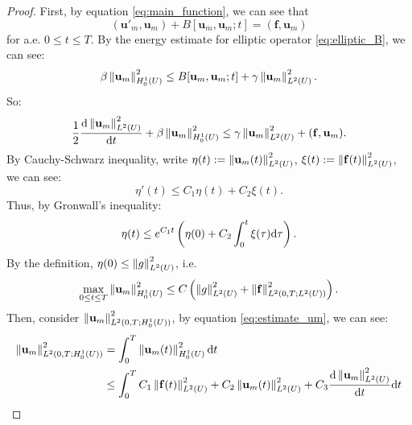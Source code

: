 \begin{proof}
    First, by equation \eqref{eq:main_function}, we can see that 
    \begin{equation}
        \label{eq:variation_for_um}
        (\mathbf{u}'_{m},\mathbf{u}_{m})+B[\mathbf{u}_{m},\mathbf{u}_{m};t]=(\mathbf{f},\mathbf{u}_{m})
    \end{equation}
    for a.e. $0\le t\le T$. By the energy estimate for elliptic operator \eqref{eq:elliptic_B}, we can see:
    \begin{equation}
        \label{eq:parabolic_B}
        \beta\left\|\mathbf{u}_{m}\right\|_{H_{0}^{1}(U)}^{2}\le B[\mathbf{u}_{m},\mathbf{u}_{m};t]+\gamma\left\|\mathbf{u}_{m}\right\|_{L^{2}(U)}^{2}.
    \end{equation}
    So:
    \begin{equation}
        \frac{1}{2}\frac{\mathrm{d} \left\|\mathbf{u}_{m}\right\|_{L^{2}(U)}^{2}}{\mathrm{d} t}+\beta\left\|\mathbf{u}_{m}\right\|_{H_{0}^{1}(U)}^{2}\le\gamma\left\|\mathbf{u}_{m}\right\|_{L^{2}(U)}^{2}+(\mathbf{f},\mathbf{u}_{m}).
    \end{equation}
    By Cauchy-Schwarz inequality, write $\eta(t):=\left\|\mathbf{u}_{m}(t)\right\|_{L^{2}(U)}^{2}$, $\xi(t):=\left\|\mathbf{f}(t)\right\|_{L^{2}(U)}^{2}$, we can see:
    \begin{equation}
        \eta'(t)\le C_{1}\eta(t)+C_{2}\xi(t).
    \end{equation}
    Thus, by Gronwall's inequality:
    \begin{equation}
        \eta(t)\le e^{C_{1}t}\left(\eta(0)+C_{2}\int_{0}^{t}\xi(\tau)\mathrm{d}\tau\right).
    \end{equation}
    By the definition, $\eta(0)\le\left\|g\right\|_{L^{2}(U)}^{2}$, i.e. 
    \begin{equation}
        \label{eq:estimate_um}
        \max_{0\le t\le T}\left\|\mathbf{u}_{m}\right\|_{H_{0}^{1}(U)}^{2}\le C\left(\left\|g\right\|_{L^{2}(U)}^{2}+\left\|\mathbf{f}\right\|_{L^{2}(0,T;L^{2}(U))}^{2}\right).
    \end{equation}
    Then, consider $\left\|\mathbf{u}_{m}\right\|_{L^{2}(0,T;H_{0}^{1}(U))}^{2}$, by equation \eqref{eq:estimate_um}, we can see:
    \begin{equation}
        \begin{aligned}
            \norm{\mathbf{u}_{m}}_{L^{2}(0,T;H_{0}^{1}(U))}^{2}&=\int_{0}^{T}\norm{\mathbf{u}_{m}(t)}_{H_{0}^{1}(U)}^{2}\dif t\\
            &\le \int_{0}^{T}C_{1}\norm{\mathbf{f}(t)}_{L^{2}(U)}^{2}+C_{2}\norm{\mathbf{u}_{m}(t)}_{L^{2}(U)}^{2}+C_{3}\frac{\dif \norm{\mathbf{u}_{m}}_{L^{2}(U)}^{2}}{\dif t}\dif t\\

\end{aligned}
\end{equation}
\end{proof}
